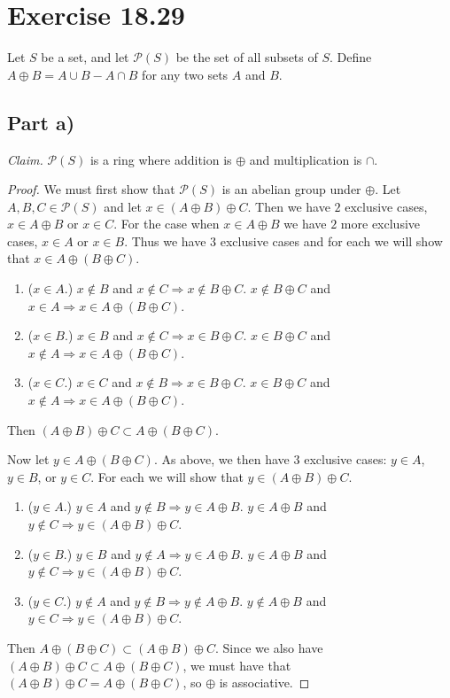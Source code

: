 \documentclass{abrice}
\renewcommand{\P}{\mathscr{P}}
\begin{document}
\section{Exercise 18.29}

Let $S$ be a set, and let $\P(S)$ be the set of all subsets of $S$. Define $A
\oplus B = A \cup B - A \cap B$ for any two sets $A$ and $B$.

\subsection{Part a)}

\emph{Claim.} $\P(S)$ is a ring where addition is $\oplus$ and multiplication
is $\cap$.

\begin{proof}
  We must first show that $\P(S)$ is an abelian group under $\oplus$. Let $A, B,
  C \in \P(S)$ and let $x \in (A \oplus B) \oplus C$. Then we have $2$ exclusive
  cases, $x \in A \oplus B$ or $x \in C$. For the case when $x \in A \oplus B$
  we have $2$ more exclusive cases, $x \in A$ or $x \in B$. Thus we have $3$
  exclusive cases and for each we will show that $x \in A \oplus (B \oplus C)$.
  \begin{enumerate}[label=\emph{\roman*})]
  \item ($x \in A$.) $x \notin B$ and $x \notin C \Rightarrow x \notin B \oplus
    C$. $x \notin B \oplus C$ and $x \in A \Rightarrow x \in A \oplus (B \oplus
    C)$.
  \item ($x \in B$.) $x \in B$ and $x \notin C \Rightarrow x \in B \oplus C$. $x
    \in B \oplus C$ and $x \notin A \Rightarrow x \in A \oplus (B \oplus C)$.
  \item ($x \in C$.) $x \in C$ and $x \notin B \Rightarrow x \in B \oplus C$.
    $x \in B \oplus C$ and $x \notin A \Rightarrow x \in A \oplus (B \oplus C)$.
  \end{enumerate}
  Then $(A \oplus B) \oplus C \subset A \oplus (B \oplus C)$.

  Now let $y \in A \oplus (B \oplus C)$. As above, we then have $3$ exclusive
  cases: $y \in A$, $y \in B$, or $y \in C$. For each we will show that $y \in
  (A \oplus B) \oplus C$.
  \begin{enumerate}[label=\emph{\roman*})]
  \item ($y \in A$.) $y \in A$ and $y \notin B \Rightarrow y \in A \oplus B$. $y
    \in A \oplus B$ and $y \notin C \Rightarrow y \in (A \oplus B) \oplus C$.
  \item ($y \in B$.) $y \in B$ and $y \notin A \Rightarrow y \in A \oplus B$. $y
    \in A \oplus B$ and $y \notin C \Rightarrow y \in (A \oplus B) \oplus C$.
  \item ($y \in C$.) $y \notin A$ and $y \notin B \Rightarrow y \notin A \oplus
    B$. $y \notin A \oplus B$ and $y \in C \Rightarrow y \in (A \oplus B) \oplus
    C$.
  \end{enumerate}
  Then $A \oplus (B \oplus C) \subset (A \oplus B) \oplus C$. Since we also have
  $(A \oplus B) \oplus C \subset A \oplus (B \oplus C)$, we must have that $(A
  \oplus B) \oplus C = A \oplus (B \oplus C)$, so $\oplus$ is associative.


\end{proof}
\end{document}
